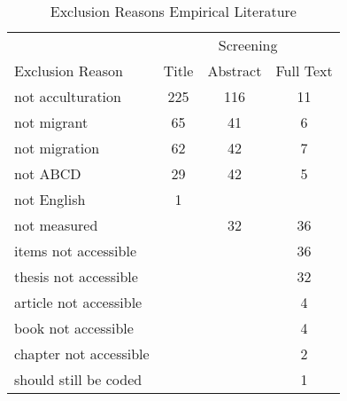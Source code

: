 \begin{table}
\begin{minipage}[t][\textheight][t]{\textwidth}

\caption{\label{tab:EmpiricalExclusion}Exclusion Reasons Empirical Literature}
\begin{tabular}[t]{lccc}
\toprule
\multicolumn{1}{c}{ } & \multicolumn{3}{c}{Screening} \\
\cmidrule(l{3pt}r{3pt}){2-4}
Exclusion Reason & Title & Abstract & Full Text\\
\midrule
not acculturation & 225 & 116 & 11\\
not migrant & 65 & 41 & 6\\
not migration & 62 & 42 & 7\\
not ABCD & 29 & 42 & 5\\
not English & 1 &  & \\
not measured &  & 32 & 36\\
items not accessible &  &  & 36\\
thesis not accessible &  &  & 32\\
article not accessible &  &  & 4\\
book not accessible &  &  & 4\\
chapter not accessible &  &  & 2\\
should still be coded &  &  & 1\\
\bottomrule
\end{tabular}
\end{minipage}
\end{table}
